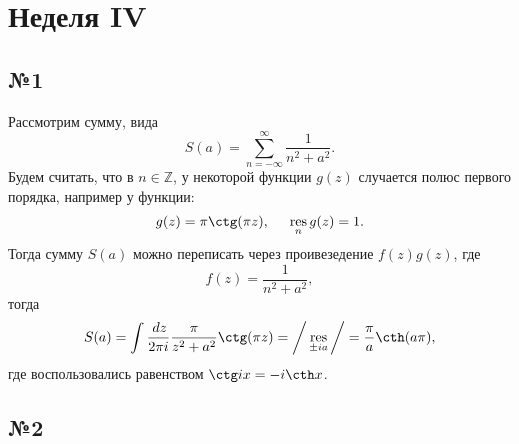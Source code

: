 \section{Неделя IV}

\subsection*{№1}

Рассмотрим сумму, вида
\begin{equation*}
    S(a) = \sum_{n=-\infty}^{\infty}  \frac{1}{n^2 + a^2}.
\end{equation*}
Будем считать, что в $n \in \mathbb{Z}$, у некоторой функции $g(z)$ случается полюс первого порядка, например у функции:
\begin{equation*}
    g(z) = \pi \ctg(\pi z), 
    \hspace{5 mm} \res_n g(z) = 1.
\end{equation*}
Тогда сумму $S(a)$ можно переписать через проивезедение $f(z) g(z)$, где 
\begin{equation*}
    f(z) = \frac{1}{n^2 + a^2},
\end{equation*}
тогда
\begin{equation*}
    S(a) = \int \frac{\d z}{2 \pi i} \frac{\pi}{z^2 + a^2} \ctg (\pi z) = 
    \bigg/
        \res_{\pm ia}
    \bigg/ = \frac{\pi}{a} \cth (a \pi),
\end{equation*}
где воспользовались равенством $\ctg i x = - i \cth x$.


\subsection*{№2}


